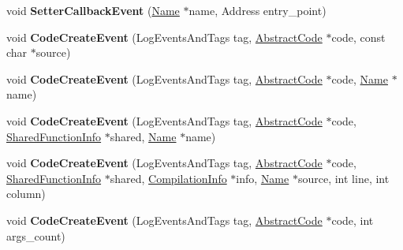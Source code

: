 \begin{DoxyCompactItemize}
\item 
void {\bfseries Setter\+Callback\+Event} (\hyperlink{classv8_1_1internal_1_1_name}{Name} $\ast$name, Address entry\+\_\+point)\hypertarget{classv8_1_1internal_1_1_logger_a2f82143fc6ec50da1efed2cc09027a65}{}\label{classv8_1_1internal_1_1_logger_a2f82143fc6ec50da1efed2cc09027a65}

\item 
void {\bfseries Code\+Create\+Event} (Log\+Events\+And\+Tags tag, \hyperlink{classv8_1_1internal_1_1_abstract_code}{Abstract\+Code} $\ast$code, const char $\ast$source)\hypertarget{classv8_1_1internal_1_1_logger_a27f32e86620d571014447d1ee69d05c1}{}\label{classv8_1_1internal_1_1_logger_a27f32e86620d571014447d1ee69d05c1}

\item 
void {\bfseries Code\+Create\+Event} (Log\+Events\+And\+Tags tag, \hyperlink{classv8_1_1internal_1_1_abstract_code}{Abstract\+Code} $\ast$code, \hyperlink{classv8_1_1internal_1_1_name}{Name} $\ast$name)\hypertarget{classv8_1_1internal_1_1_logger_a1c061d8cef850c906069a10d53fe2f00}{}\label{classv8_1_1internal_1_1_logger_a1c061d8cef850c906069a10d53fe2f00}

\item 
void {\bfseries Code\+Create\+Event} (Log\+Events\+And\+Tags tag, \hyperlink{classv8_1_1internal_1_1_abstract_code}{Abstract\+Code} $\ast$code, \hyperlink{classv8_1_1internal_1_1_shared_function_info}{Shared\+Function\+Info} $\ast$shared, \hyperlink{classv8_1_1internal_1_1_name}{Name} $\ast$name)\hypertarget{classv8_1_1internal_1_1_logger_a5c52e2a140fc4b8737acf2420adf60cd}{}\label{classv8_1_1internal_1_1_logger_a5c52e2a140fc4b8737acf2420adf60cd}

\item 
void {\bfseries Code\+Create\+Event} (Log\+Events\+And\+Tags tag, \hyperlink{classv8_1_1internal_1_1_abstract_code}{Abstract\+Code} $\ast$code, \hyperlink{classv8_1_1internal_1_1_shared_function_info}{Shared\+Function\+Info} $\ast$shared, \hyperlink{classv8_1_1internal_1_1_compilation_info}{Compilation\+Info} $\ast$info, \hyperlink{classv8_1_1internal_1_1_name}{Name} $\ast$source, int line, int column)\hypertarget{classv8_1_1internal_1_1_logger_a52539458fb29e5fe338fc1c6b018a728}{}\label{classv8_1_1internal_1_1_logger_a52539458fb29e5fe338fc1c6b018a728}

\item 
void {\bfseries Code\+Create\+Event} (Log\+Events\+And\+Tags tag, \hyperlink{classv8_1_1internal_1_1_abstract_code}{Abstract\+Code} $\ast$code, int args\+\_\+count)\hypertarget{classv8_1_1internal_1_1_logger_a23b49589a5a7ab787e80733e2aac7dca}{}\label{classv8_1_1internal_1_1_logger_a23b49589a5a7ab787e80733e2aac7dca}


\end{DoxyCompactItemize}
